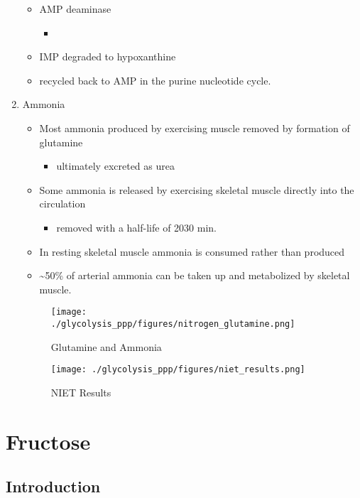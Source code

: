 \documentclass{scrartcl}
\begin{document}
\begin{enumerate}
\begin{itemize}
\item AMP deaminase
\begin{itemize}
\item {}
\end{itemize}

\item IMP degraded to hypoxanthine
\item recycled back to AMP in the purine nucleotide cycle.
\end{itemize}

\item Ammonia
\label{sec:org37a0c9b}
\begin{itemize}
\item Most ammonia produced by exercising muscle removed by formation of glutamine
\begin{itemize}
\item ultimately excreted as urea
\end{itemize}
\item Some ammonia is released by exercising skeletal muscle directly into the circulation
\begin{itemize}
\item removed with a half-life of 20\textpm{}30 min.
\end{itemize}
\item In resting skeletal muscle ammonia is consumed rather than produced
\item \textasciitilde{}50\% of arterial ammonia can be taken up and metabolized by skeletal muscle.
\end{itemize}

\begin{figure}[htbp]
\centering
\texttt{[image: ./glycolysis\_ppp/figures/nitrogen\_glutamine.png]}
\caption[gln]{\label{fig:orgcd83b79}
Glutamine and Ammonia}
\end{figure}

\begin{figure}[htbp]
\centering
\texttt{[image: ./glycolysis\_ppp/figures/niet\_results.png]}
\caption[interp]{\label{fig:orgb526be2}
NIET Results}
\end{figure}
\end{enumerate}
\section{Fructose}
\label{sec:orgfa2423e}
\subsection{Introduction}
\label{sec:org5dea6a3}
\end{document}
